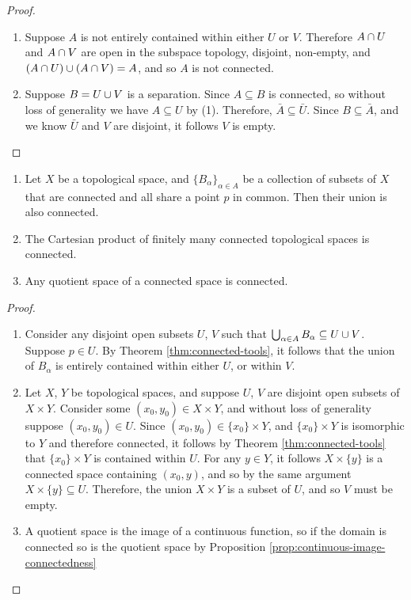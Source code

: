\begin{proof}\proofbreak
    \begin{enumerate}[label=(\arabic*)]
        \item Suppose $A$ is not entirely contained within either $U$ or $V$. Therefore $A \cap U$ and $A \cap V$ are open in the subspace topology, disjoint, non-empty, and $(A \cap U) \cup (A \cap V) = A$, and so $A$ is not connected.
        \item Suppose $B = U \cup V$ is a separation. Since $A \subseteq B$ is connected, so without loss of generality we have $A \subseteq U$ by (1). Therefore, $\bar{A} \subseteq \bar{U}$. Since $B \subseteq \bar{A}$, and we know $\bar{U}$ and $V$ are disjoint, it follows $V$ is empty.
    \end{enumerate}
\end{proof}

\begin{thm}\label{thm:connected-constructs}\proofbreak
    \begin{enumerate}[label=(\arabic*)]
        \item Let $X$ be a topological space, and $\{B_{\alpha}\}_{\alpha\in A}$ be a collection of subsets of $X$ that are connected and all share a point $p$ in common. Then their union is also connected.
        \item The Cartesian product of finitely many connected topological spaces is connected.
        \item Any quotient space of a connected space is connected.
    \end{enumerate}
\end{thm}

\begin{proof}\proofbreak
    \begin{enumerate}[label=(\arabic*)]
        \item Consider any disjoint open subsets $U$, $V$ such that $\bigcup_{\alpha\in A}B_{\alpha} \subseteq U \cup V$. Suppose $p \in U$. By Theorem \ref{thm:connected-tools}, it follows that the union of $B_{\alpha}$ is entirely contained within either $U$, or within $V$.
        \item Let $X$, $Y$ be topological spaces, and suppose $U$, $V$ are disjoint open subsets of $X \times Y$. Consider some $(x_0, y_0) \in X \times Y$, and without loss of generality suppose $(x_0, y_0) \in U$. Since $(x_0, y_0) \in \{x_0\} \times Y$, and $\{x_0\} \times Y$ is isomorphic to $Y$ and therefore connected, it follows by Theorem \ref{thm:connected-tools} that $\{x_0\} \times Y$ is contained within $U$. For any $y \in Y$, it follows $X \times \{y\}$ is a connected space containing $(x_0, y)$, and so by the same argument $X \times \{y\} \subseteq U$. Therefore, the union $X \times Y$ is a subset of $U$, and so $V$ must be empty.
        \item A quotient space is the image of a continuous function, so if the domain is connected so is the quotient space by Proposition \ref{prop:continuous-image-connectedness}
    \end{enumerate}
\end{proof}

